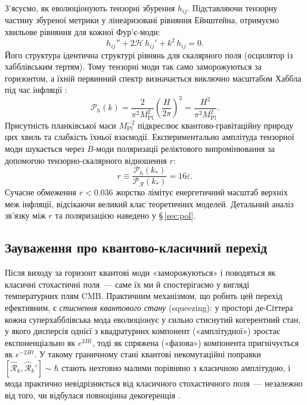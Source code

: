 З'ясуємо, як еволюціонують тензорні збурення $h_{ij}$. Підставляючи тензорну частину збуреної метрики у лінеаризовані рівняння Ейнштейна, отримуємо хвильове рівняння для кожної Фур'є-моди:
\begin{equation}\label{eq:tensor_wave_eq}
  h_{ij}'' + 2\mathcal{H}\,h_{ij}' + k^2\,h_{ij} = 0.
\end{equation}
Його структура ідентична структурі рівнянь для скалярного поля (осцилятор із хабблівським тертям). Тому тензорні моди так само заморожуються за горизонтом, а їхній первинний спектр визначається виключно масштабом Хаббла під час інфляції \cite{starobinsky_1979}:
\begin{equation}\label{eq:tensor_power_spec}
  \mathcal{P}_h(k) = \frac{2}{\pi^2 M_\mathrm{Pl}^2} \left(\frac{H}{2\pi}\right)^{\!2} = \frac{H^2}{\pi^2 M_\mathrm{Pl}^2}.
\end{equation}
Присутність планківської маси $M_\mathrm{Pl}^{-2}$ підкреслює квантово-гравітаційну природу цих хвиль та слабкість їхньої взаємодії. Експериментально амплітуда тензорної моди шукається через $B$-моди поляризації реліктового випромінювання за допомогою тензорно-скалярного відношення $r$:
\begin{equation}\label{eq:tensor_scalar_ratio}
  r \equiv \frac{\mathcal{P}_h(k_*)}{\mathcal{P}_{\mathcal{R}}(k_*)} = 16\varepsilon.
\end{equation}
Сучасне обмеження $r < 0.036$ \cite{bicep_keck_2021} жорстко лімітує енергетичний масштаб верхніх меж інфляції, відсікаючи великий клас теоретичних моделей. Детальний аналіз зв'язку між $r$ та поляризацією наведено у §\,\ref{sec:pol}.

\subsection*{Зауваження про квантово-класичний перехід}

Після виходу за горизонт квантові моди «заморожуються» і поводяться як класичні
стохастичні поля~--- саме їх ми й спостерігаємо у вигляді температурних плям CMB.
Практичним механізмом, що робить цей перехід ефективним, є \emph{стиснення
квантового стану} (squeezing): у просторі де-Сіттера кожна суперхабблівська
мода еволюціонує у сильно стиснутий когерентний стан, у якого дисперсія однієї
з квадратурних компонент («амплітудної») зростає експоненціально як $e^{2Ht}$,
тоді як спряжена («фазова») компонента пригнічується як $e^{-2Ht}$.
У такому граничному стані квантові некомутаційні поправки
$[\hat{\mathcal{R}}_k, \hat{\mathcal{R}}_k'] \sim \hbar$ стають нехтовно малими
порівняно з класичною амплітудою, і мода практично невідрізняється від класичного
стохастичного поля~--- незалежно від того, чи відбулася повноцінна декогеренція
\cite{polarski_starobinsky_1996, kiefer_polarski_1998}.

